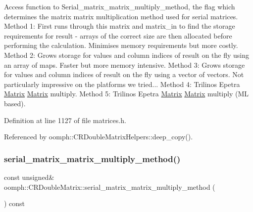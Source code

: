 Access function to Serial\+\_\+matrix\+\_\+matrix\+\_\+multiply\+\_\+method, the flag which determines the matrix matrix multiplication method used for serial matrices. Method 1\+: First runs through this matrix and matrix\+\_\+in to find the storage requirements for result -\/ arrays of the correct size are then allocated before performing the calculation. Minimises memory requirements but more costly. Method 2\+: Grows storage for values and column indices of result \textquotesingle{}on the fly\textquotesingle{} using an array of maps. Faster but more memory intensive. Method 3\+: Grows storage for values and column indices of result \textquotesingle{}on the fly\textquotesingle{} using a vector of vectors. Not particularly impressive on the platforms we tried... Method 4\+: Trilinos Epetra \hyperlink{classoomph_1_1Matrix}{Matrix} \hyperlink{classoomph_1_1Matrix}{Matrix} multiply. Method 5\+: Trilinos Epetra \hyperlink{classoomph_1_1Matrix}{Matrix} \hyperlink{classoomph_1_1Matrix}{Matrix} multiply (ML based). 



Definition at line 1127 of file matrices.\+h.



Referenced by oomph\+::\+C\+R\+Double\+Matrix\+Helpers\+::deep\+\_\+copy().

\mbox{\label{classoomph_1_1CRDoubleMatrix_ae8eff79ad9ac6e399ef4b677b6e0e1e5}} 
\subsubsection{\texorpdfstring{serial\+\_\+matrix\+\_\+matrix\+\_\+multiply\+\_\+method()}{serial\_matrix\_matrix\_multiply\_method()}\hspace{0.1cm}{\footnotesize\ttfamily [2/2]}}
{\footnotesize\ttfamily const unsigned\& oomph\+::\+C\+R\+Double\+Matrix\+::serial\+\_\+matrix\+\_\+matrix\+\_\+multiply\+\_\+method (\begin{DoxyParamCaption}{ }\end{DoxyParamCaption}) const\hspace{0.3cm}{\ttfamily [inline]}}



